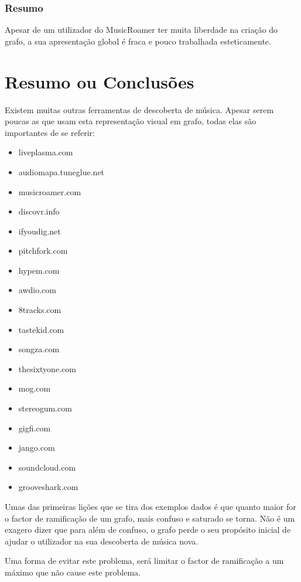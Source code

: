 
  \subsubsection{Resumo} %
  \label{ssub:resumo}

  Apesar de um utilizador do MusicRoamer ter muita liberdade na criação do grafo, a sua apresentação global é fraca e pouco trabalhada esteticamente.
  





\section{Resumo ou Conclusões}

Existem muitas outras ferramentas de descoberta de música. Apesar serem poucas as que usam esta representação visual em grafo, todas elas são importantes de se referir:

\begin{itemize}
  \item liveplasma.com
  \item audiomapa.tuneglue.net
  \item musicroamer.com
  \item discovr.info
  \item ifyoudig.net
  \item pitchfork.com
  \item hypem.com
  \item awdio.com
  \item 8tracks.com
  \item tastekid.com
  \item songza.com
  \item thesixtyone.com
  \item mog.com
  \item stereogum.com
  \item gigfi.com
  \item jango.com
  \item soundcloud.com
  \item grooveshark.com
\end{itemize}


Umas das primeiras lições que se tira dos exemplos dados é que quanto maior for o factor de ramificação de um grafo, mais confuso e saturado se torna.
Não é um exagero dizer que para além de confuso, o grafo perde o seu propósito inicial de ajudar o utilizador na sua descoberta de música nova.

Uma forma de evitar este problema, será limitar o factor de ramificação a um máximo que não cause este problema.

